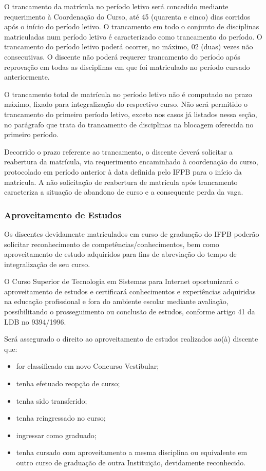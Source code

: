 	O trancamento da matrícula no período letivo será concedido mediante requerimento à Coordenação do Curso, até 45 (quarenta e cinco) dias corridos após o início do período letivo. O trancamento em todo o conjunto de disciplinas matriculadas num período letivo é caracterizado como trancamento do período. O trancamento do período letivo poderá ocorrer, no máximo, 02 (duas) vezes não consecutivas. O discente não poderá requerer trancamento do período após reprovação em todas as disciplinas em que foi matriculado no período cursado anteriormente.

	O trancamento total de matrícula no período letivo não é computado no prazo máximo, fixado para integralização do respectivo curso. Não será permitido o trancamento do primeiro período letivo, exceto nos casos já listados nessa seção, no parágrafo que trata do trancamento de disciplinas na blocagem oferecida no primeiro período.

	Decorrido o prazo referente ao trancamento, o discente deverá solicitar a reabertura da matrícula, via requerimento encaminhado à coordenação do curso, protocolado em período anterior à data definida pelo IFPB para o início da matrícula. A não solicitação de reabertura de matrícula após trancamento caracteriza a situação de abandono de curso e a consequente perda da vaga.

\subsubsection{Aproveitamento de Estudos}

	Os discentes devidamente matriculados em curso de graduação do IFPB poderão solicitar reconhecimento de competências/conhecimentos, bem como aproveitamento de estudo adquiridos para fins de abreviação do tempo de integralização de seu curso.
	
	O Curso Superior de Tecnologia em Sistemas para Internet oportunizará o aproveitamento de estudos e certificará conhecimentos e experiências adquiridas na educação profissional e fora do ambiente escolar mediante avaliação, possibilitando o prosseguimento ou conclusão de estudos, conforme artigo 41 da LDB no 9394/1996.
	
Será assegurado o direito ao aproveitamento de estudos realizados ao(à) discente que:
	\begin{itemize}
		\item for classificado em novo Concurso Vestibular;
		\item tenha efetuado reopção de curso;
		\item tenha sido transferido;
		\item tenha reingressado no curso;
		\item ingressar como graduado;
		\item tenha cursado com aproveitamento a mesma disciplina ou equivalente em outro curso de graduação de outra Instituição, devidamente reconhecido.
		\end{itemize}
		
